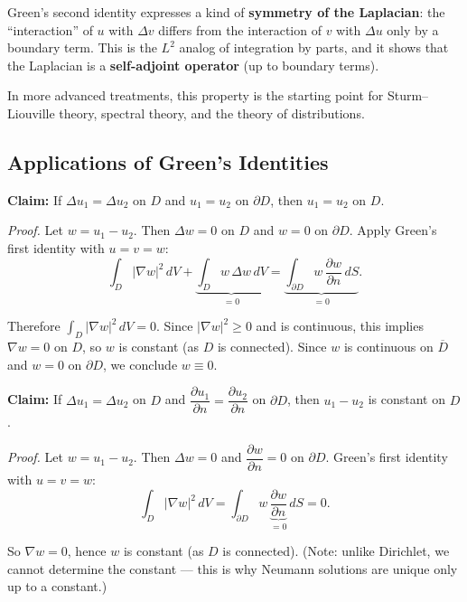 \documentclass[11pt]{report}
\begin{document}
\begin{remark}
Green's second identity expresses a kind of \textbf{symmetry of the Laplacian}: the ``interaction'' of $u$ with $\Delta v$ differs from the interaction of $v$ with $\Delta u$ only by a boundary term. This is the $L^2$ analog of integration by parts, and it shows that the Laplacian is a \textbf{self-adjoint operator} (up to boundary terms).

In more advanced treatments, this property is the starting point for Sturm--Liouville theory, spectral theory, and the theory of distributions.
\end{remark}

\subsection{Applications of Green's Identities}

\begin{example}
\textbf{Claim:} If $\Delta u_1 = \Delta u_2$ on $D$ and $u_1 = u_2$ on $\partial D$, then $u_1 = u_2$ on $D$.

\textit{Proof.} Let $w = u_1 - u_2$. Then $\Delta w = 0$ on $D$ and $w = 0$ on $\partial D$. Apply Green's first identity with $u = v = w$:
\[
\int_D |\nabla w|^2 \, dV + \underbrace{\int_D w \, \Delta w \, dV}_{= 0} = \underbrace{\int_{\partial D} w \, \frac{\partial w}{\partial n} \, dS}_{= 0}.
\]

Therefore $\int_D |\nabla w|^2 \, dV = 0$. Since $|\nabla w|^2 \geq 0$ and is continuous, this implies $\nabla w = 0$ on $D$, so $w$ is constant (as $D$ is connected). Since $w$ is continuous on $\overline{D}$ and $w = 0$ on $\partial D$, we conclude $w \equiv 0$.
\end{example}

\begin{example}
\textbf{Claim:} If $\Delta u_1 = \Delta u_2$ on $D$ and $\dfrac{\partial u_1}{\partial n} = \dfrac{\partial u_2}{\partial n}$ on $\partial D$, then $u_1 - u_2$ is constant on $D$.

\textit{Proof.} Let $w = u_1 - u_2$. Then $\Delta w = 0$ and $\dfrac{\partial w}{\partial n} = 0$ on $\partial D$. Green's first identity with $u = v = w$:
\[
\int_D |\nabla w|^2 \, dV = \int_{\partial D} w \, \underbrace{\frac{\partial w}{\partial n}}_{= 0} \, dS = 0.
\]

So $\nabla w = 0$, hence $w$ is constant (as $D$ is connected). (Note: unlike Dirichlet, we cannot determine the constant --- this is why Neumann solutions are unique only up to a constant.)
\end{example}
\end{document}
